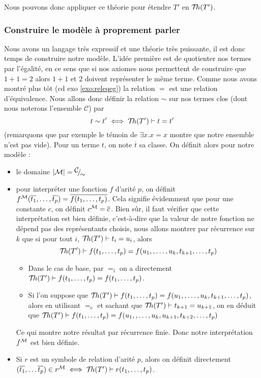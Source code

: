 Nous pouvons donc appliquer ce théorie pour étendre $T'$ en $\mathcal{T}\!h(T')$.

\subsubsection{Construire le modèle à proprement parler}

Nous avons un langage très expressif et une théorie très puissante, il est donc temps de construire notre modèle. L'idée première est de quotienter nos termes par l'égalité, en ce sens que si nos axiomes nous permettent de construire que $1+1=2$ alors $1+1$ et $2$ doivent représenter le même terme. Comme nous avons montré plus tôt (cd exo \ref{exo:releqeg}) la relation $=$ est une relation d'équivalence. Nous allons donc définir la relation $\sim$ sur nos termes clos (dont nous noterons l'ensemble $\mathcal C$) par $$t\sim t' \iff \mathcal{T}\!h(T')\vdash t = t'$$ (remarquons que par exemple le témoin de $\exists x. x=x$ montre que notre ensemble n'est pas vide). Pour un terme $t$, on note $\overline t$ sa classe. On définit alors pour notre modèle :
\begin{itemize}[label=$\bullet$]
    \item le domaine $|\MM| = \quot{\mathcal C}{\sim}$
    \item pour interpréter une fonction $f$ d'arité $p$, on définit $f^\mathcal M(\overline{t_1},\ldots,\overline{t_p}) = \overline{f(t_1,\ldots,t_p)}$. Cela signifie évidemment que pour une constante $c$, on définit $c^\mathcal M = \overline c$. Bien sûr, il faut vérifier que cette interprétation est bien définie, c'est-à-dire que la valeur de notre fonction ne dépend pas des représentants choisis, nous allons montrer par récurrence sur $k$ que si pour tout $i$, $\mathcal{T}\!h(T')\vdash t_i=u_i$, alors $$\mathcal{T}\!h(T')\vdash f(t_1,\ldots,t_p)=f(u_1,,\ldots,u_k,t_{k+1},\ldots,t_p)$$
    \begin{itemize}
        \item Dans le cas de base, par $=_\mathrm i$ on a directement $\mathcal{T}\!h(T')\vdash f(t_1,\ldots,t_p) = f(t_1,\ldots,t_p)$.
        \item Si l'on suppose que $\mathcal{T}\!h(T')\vdash f(t_1,\ldots,t_p)=f(u_1,,\ldots,u_k,t_{k+1},\ldots,t_p)$, alors en utilisant $=_\mathrm e$ et sachant que $\mathcal{T}\!h(T')\vdash t_{k+1}=u_{k+1}$, on en déduit que $\mathcal{T}\!h(T')\vdash f(t_1,\ldots,t_p)=f(u_1,,\ldots,u_k,u_{k+1},t_{k+2},\ldots,t_p)$
    \end{itemize}
    Ce qui montre notre résultat par récurrence finie. Donc notre interprétation $f^\mathcal M$ est bien définie.
    \item Si $r$ est un symbole de relation d'arité $p$, alors on définit directement $(\overline{t_1},\ldots \overline{t_p})\in r^\mathcal M\iff \mathcal{T}\!h(T')\vdash r(t_1,\ldots,t_p)$. 
\end{itemize}

